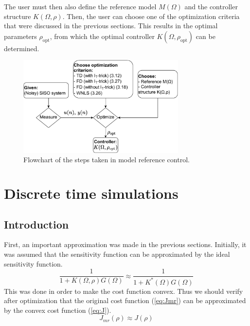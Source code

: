 
The user must then also define the reference model $M(\Omega)$ and the controller structure $K(\Omega,\rho)$. Then, the user can choose one of the optimization criteria that were discussed in the previous sections. This results in the optimal parameters $\rho_{\mathrm{opt}}$, from which the optimal controller $K(\Omega,\rho_{\mathrm{opt}})$ can be determined.

\begin{figure}[H]
\centering
\includegraphics[width = 0.75\textwidth]{figures/flowchart.pdf}
\caption{Flowchart of the steps taken in model reference control.}
\label{fig:flowchart}
\end{figure}


\newpage
\section{Discrete time simulations}
\label{sec:DT_simulations}

\subsection{Introduction}
\label{sec:DT_simulations_introduction}
First, an important approximation was made in the previous sections. Initially, it was assumed that the sensitivity function can be approximated by the ideal sensitivity function.
\begin{equation*}
\frac{1}{1 + K(\Omega,\rho) G(\Omega)} \approx \frac{1}{1 + K^{*}(\Omega) G(\Omega)}
\end{equation*}
This was done in order to make the cost function convex. Thus we should verify after optimization that the original cost function (\ref{eq:Jmr}) can be approximated by the convex cost function (\ref{eq:J}).
\begin{equation*}
	J_{mr}(\rho) \approx J(\rho)
\end{equation*}

